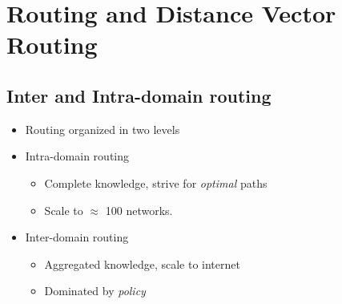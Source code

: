 \chapter{Routing and Distance Vector Routing}
\section{Inter and Intra-domain routing}
\begin{itemize}[nosep]
    \item Routing organized in two levels
    \item Intra-domain routing
          \begin{itemize}[nosep]
              \item Complete knowledge, strive for \emph{optimal} paths
              \item Scale to $\approx$ 100 networks.
          \end{itemize}
    \item Inter-domain routing
          \begin{itemize}[nosep]
              \item Aggregated knowledge, scale to internet
              \item Dominated by \emph{policy}
          \end{itemize}
\end{itemize}
